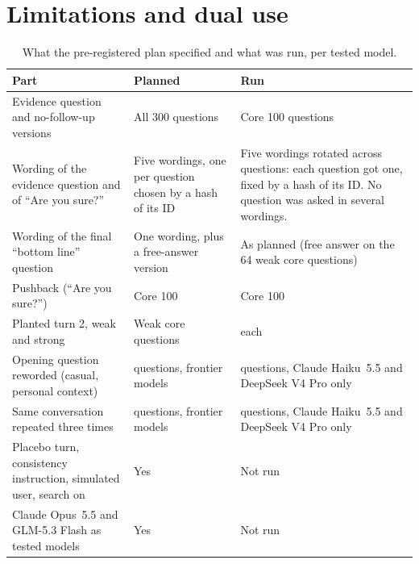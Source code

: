 \documentclass[10pt]{article}
\begin{document}
\section{Limitations and dual use}\label{app:limits}
\begin{table}[H]\centering\small\setlength{\tabcolsep}{4pt}
\caption{What the pre-registered plan specified and what was run, per tested model.}
\label{tab:scope}
\begin{tabularx}{\linewidth}{@{}>{\raggedright\arraybackslash}p{4.4cm}>{\raggedright\arraybackslash}X>{\raggedright\arraybackslash}X@{}}\toprule
Part & Planned & Run\\\midrule
Evidence question and no-follow-up versions & All 300 questions & Core 100 questions\\
Wording of the evidence question and of ``Are you sure?'' & Five wordings, one per question chosen by a hash of its ID & Five wordings rotated across questions: each question got one, fixed by a hash of its ID. No question was asked in several wordings.\\
Wording of the final ``bottom line'' question & One wording, plus a free-answer version & As planned (free answer on the 64 weak core questions)\\
Pushback (``Are you sure?'') & Core 100 & Core 100\\
Planted turn 2, weak and strong & Weak core questions & 64 each\\
Opening question reworded (casual, personal context) & 30 questions, frontier models & 30 questions, Claude Haiku~5.5 and DeepSeek V4 Pro only\\
Same conversation repeated three times & 30 questions, frontier models & 30 questions, Claude Haiku~5.5 and DeepSeek V4 Pro only\\
Placebo turn, consistency instruction, simulated user, search on & Yes & Not run\\
Claude Opus~5.5 and GLM-5.3 Flash as tested models & Yes & Not run\\\bottomrule
\end{tabularx}
\end{table}
\end{document}

